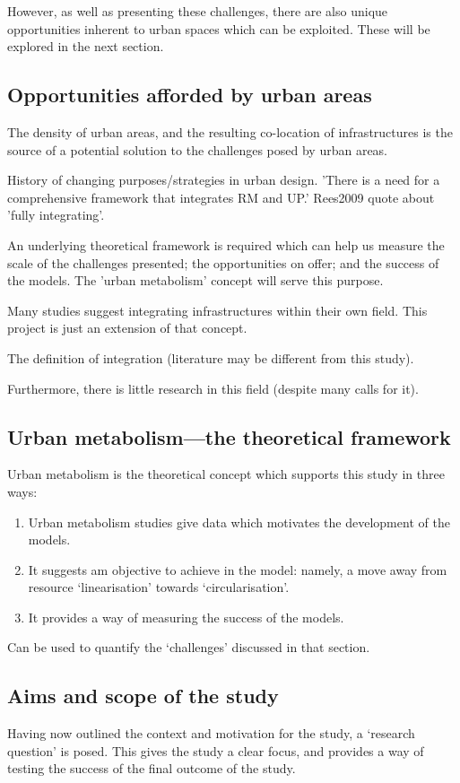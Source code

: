 However, as well as presenting these challenges, there are also unique opportunities inherent to urban spaces which can be exploited. These will be explored in the next section.

\subsection{Opportunities afforded by urban areas}
The density of urban areas, and the resulting co-location of infrastructures is the source of a potential solution to the challenges posed by urban areas.

\citep{Agudelo-Vera2011} History of changing purposes/strategies in urban design. 
'There is a need for a comprehensive framework that integrates RM and UP.'
Rees2009 quote about 'fully integrating'.

An underlying theoretical framework is required which can help us measure the scale of the challenges presented; the opportunities on offer; and the success of the models. The 'urban metabolism' concept will serve this purpose.

Many studies suggest integrating infrastructures within their own field. This project is just an extension of that concept.

The definition of integration (literature may be different from this study).

Furthermore, there is little research in this field (despite many calls for it).  

\subsection{Urban metabolism---the theoretical framework}
Urban metabolism is the theoretical concept which supports this study in three ways:
\begin{enumerate}
	\item Urban metabolism studies give data which motivates the development of the models.
	\item It suggests am objective to achieve in the model: namely, a move away from resource `linearisation' towards `circularisation'.
	\item It provides a way of measuring the success of the models.
\end{enumerate}
Can be used to quantify the `challenges' discussed in that section.

\subsection{Aims and scope of the study}
Having now outlined the context and motivation for the study, a `research question' is posed. This gives the study a clear focus, and provides a way of testing the success of the final outcome of the study.


